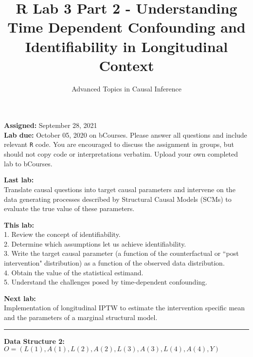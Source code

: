 \documentclass{exam}
\title{R Lab 3 Part 2 - Understanding Time Dependent Confounding and Identifiability in Longitudinal Context}
\author{Advanced Topics in Causal Inference}
\date{}
\begin{document}
\maketitle



\noindent \textbf{Assigned:} September 28, 2021\\
\textbf{Lab due:} October 05, 2020 on bCourses. Please answer all questions and include relevant \texttt{R} code. You are encouraged to discuss the assignment in groups, but should not copy code or interpretations verbatim. Upload your own completed lab to bCourses.



\noindent \textbf{Last lab:} \\
Translate causal questions into target causal parameters and intervene on the data generating processes described by Structural Causal Models (SCMs) to evaluate the true value of these parameters. 


\noindent \textbf{This lab:}\\
1. Review the concept of identifiability. \\
2. Determine which assumptions let us achieve identifiability. \\
3. Write the target causal parameter (a function of the counterfactual or ``post intervention" distribution) as a function of the observed data distribution. \\
4. Obtain the value of the statistical estimand. \\
5. Understand the challenges posed by time-dependent confounding.

\noindent \textbf{Next lab:}\\
Implementation of longitudinal IPTW to estimate the intervention specific mean and the parameters of a marginal structural model.



\begin{center}
\noindent\rule{18cm}{0.4pt}
\end{center}

\noindent\large\textbf{Data Structure 2: $O = (L(1), A(1), L(2), A(2), L(3), A(3), L(4), A(4), Y)$}
\normalsize
\end{document}
